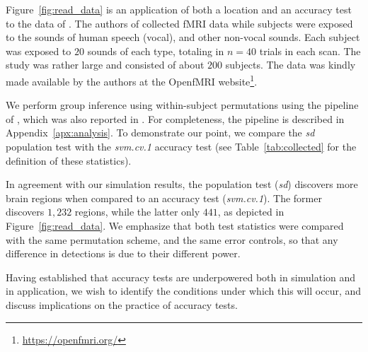 \documentclass[12pt,a4paper]{article}
\theoremstyle{definition}
\begin{document}
Figure~\ref{fig:read_data} is an application of both a location and an accuracy test to the data of \cite{pernet_human_2015}. 
The authors of \cite{pernet_human_2015} collected fMRI data while subjects were exposed to the sounds of human speech (vocal), and other non-vocal sounds. 
Each subject was exposed to $20$ sounds of each type, totaling in $n=40$ trials in each scan.
The study was rather large and consisted of about $200$ subjects.
The data was kindly made available by the authors at the OpenfMRI website\footnote{\url{https://openfmri.org/}}.

We perform group inference using within-subject permutations using the pipeline of \cite{stelzer_statistical_2013}, which was also reported in \cite{gilron_quantifying_2016}. 
For completeness, the pipeline is described in Appendix~\ref{apx:analysis}. 
To demonstrate our point, we compare the \emph{sd} population test with the \emph{svm.cv.1} accuracy test (see Table~\ref{tab:collected} for the definition of these statistics). 

In agreement with our simulation results, the population test (\emph{sd}) discovers more brain regions when compared to an accuracy test (\emph{svm.cv.1}).
The former discovers $1,232$ regions, while the latter only $441$, as depicted in Figure~\ref{fig:read_data}.
We emphasize that both test statistics were compared with the same permutation scheme, and the same error controls, so that any difference in detections is due to their different power.

Having established that accuracy tests are underpowered both in simulation and in application, we wish to identify the conditions under which this will occur, and discuss implications on the practice of accuracy tests. 
\end{document}
